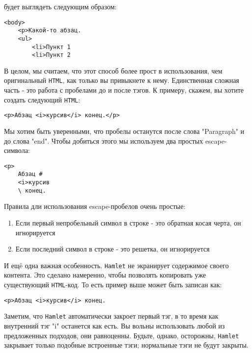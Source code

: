 будет выглядеть следующим образом:
\begin{lstlisting}
<body>                                                                          
    <p>Какой-то абзац.
    <ul>                                                                        
        <li>Пункт 1                                                              
        <li>Пункт 2    
\end{lstlisting}

В целом, мы считаем, что этот способ более прост в использования, чем 
оригинальный \texttt{HTML}, как только вы привыкнете к нему. Единственная сложная часть
 - это работа с пробелами до и после тэгов. К примеру, скажем, вы хотите
создать следующий \texttt{HTML}:

\begin{lstlisting}
<p>Абзац <i>курсив</i> конец.</p>
\end{lstlisting}

Мы хотим быть уверенными, что пробелы останутся после слова "Paragraph" и
до слова "end". Чтобы добиться этого мы используем два простых escape-символа:

\begin{lstlisting}
<p>                                                                             
    Абзац #
    <i>курсив                                                    
    \ конец.         
\end{lstlisting}

Правила дли использования escape-пробелов очень простые:
\begin{enumerate}
\item Если первый непробельный символ в строке - это обратная косая черта, 
он игнорируется
\item Если последний символ в строке - это решетка, он игнорируется
\end{enumerate}

И ещë одна важная особенность. \texttt{Hamlet} не экранирует содержимое своего контента.
Это сделано намеренно, чтобы позволять копировать уже существующий \texttt{HTML}-код.
То есть пример выше может быть записан как:
\begin{lstlisting}
<p>Абзац <i>курсив</i> конец.
\end{lstlisting}

Заметим, что \texttt{Hamlet} автоматически закроет первый тэг, в то время как внутренний
тэг "i" останется как есть. Вы вольны использовать любой из предложенных
подходов, они равноценны. Будьте, однако, осторожны, \texttt{Hamlet} закрывает только
подобные встроенные тэги; нормальные тэги не будут закрыты.

